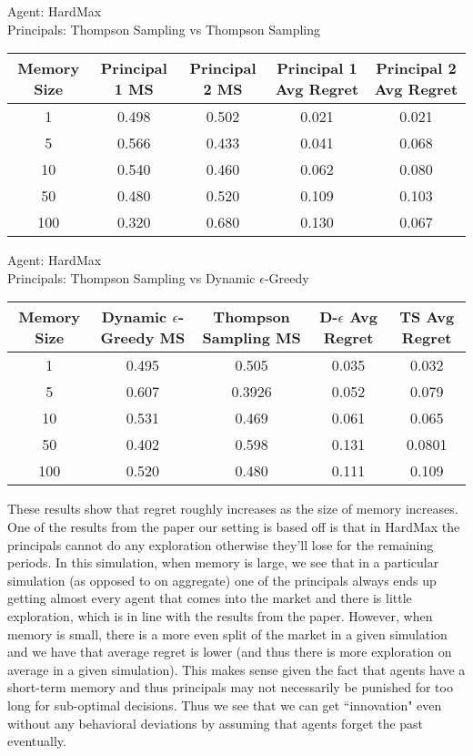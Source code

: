 \documentclass[11pt,letterpaper]{article}
\begin{document}
\begin{center}
Agent: HardMax \\Principals: Thompson Sampling vs Thompson Sampling
 \begin{tabular}{||c c c c c||} 
 \hline
 Memory Size & Principal 1 MS & Principal 2 MS & Principal 1 Avg Regret & Principal 2 Avg Regret  \\ [0.5ex] 
 \hline\hline
 1 & 0.498 & 0.502 & 0.021 & 0.021 \\ 
 \hline
 5 & 0.566 & 0.433 & 0.041 & 0.068 \\
 \hline
 10 & 0.540 & 0.460 & 0.062 & 0.080 \\
 \hline
 50 & 0.480 & 0.520 & 0.109 & 0.103 \\
 \hline
 100 & 0.320 & 0.680 & 0.130 & 0.067 \\ [1ex] 
 \hline
\end{tabular}

\vspace{0.75cm}
Agent: HardMax \\Principals: Thompson Sampling vs Dynamic $\epsilon$-Greedy
 \begin{tabular}{||c c c c c||} 
 \hline
 Memory Size & Dynamic $\epsilon$-Greedy MS  & Thompson Sampling MS & D-$\epsilon$ Avg Regret & TS Avg Regret  \\ [0.5ex] 
 \hline\hline
 1 & 0.495 & 0.505 & 0.035 & 0.032 \\ 
 \hline
 5 & 0.607 & 0.3926 & 0.052 & 0.079 \\
 \hline
 10 & 0.531 & 0.469 & 0.061 & 0.065 \\
 \hline
 50 & 0.402 & 0.598 & 0.131 & 0.0801 \\
 \hline
 100 & 0.520 & 0.480 & 0.111 & 0.109 \\ [1ex] 
 \hline
\end{tabular}
\end{center}

These results show that regret roughly increases as the size of memory increases. One of the results from the paper our setting is based off is that in HardMax the principals cannot do any exploration otherwise they'll lose for the remaining periods. In this simulation, when memory is large, we see that in a particular simulation (as opposed to on aggregate) one of the principals always ends up getting almost every agent that comes into the market and there is little exploration, which is in line with the results from the paper. However, when memory is small, there is a more even split of the market in a given simulation and we have that average regret is lower (and thus there is more exploration on average in a given simulation). This makes sense given the fact that agents have a short-term memory and thus principals may not necessarily be punished for too long for sub-optimal decisions. Thus we see that we can get ``innovation" even without any behavioral deviations by assuming that agents forget the past eventually.
\end{document}
